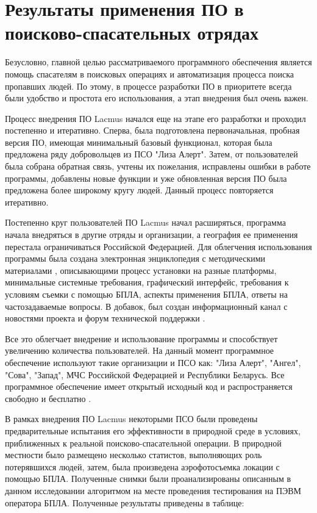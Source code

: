 \section{Результаты применения ПО в поисково-спасательных отрядах}\label{sect-8}

Безусловно, главной целью рассматриваемого программного обеспечения является помощь спасателям в поисковых операциях и автоматизация процесса поиска пропавших людей. По этому, в процессе разработки ПО в приоритете всегда были удобство и простота его использования, а этап внедрения был очень важен.

Процесс внедрения ПО Lacmus начался еще на этапе его разработки и проходил постепенно и итеративно. Сперва, была подготовлена первоначальная, пробная версия ПО, имеющая минимальный базовый функционал, которая была предложена ряду добровольцев из ПСО "Лиза Алерт". Затем, от пользователей была собрана обратная связь, учтены их пожелания, исправлены ошибки в работе программы, добавлены новые функции и уже обновленная версия ПО была предложена более широкому кругу людей. Данный процесс повторяется итеративно. 

Постепенно круг пользователей ПО Lacmus начал расширяться, программа начала внедряться в другие отряды и организации, а география ее применения перестала ограничиваться Российской Федерацией. Для облегчения использования программы была создана электронная энциклопедия с методическими материалами \cite{lib-lacmus-wiki}, описывающими процесс установки на разные платформы, минимальные системные требования, графический интерфейс, требования к условиям съемки с помощью БПЛА, аспекты применения БПЛА, ответы на частозадаваемые вопросы. В добавок, был создан информационный канал с новостями проекта \cite{lib-lacmus-news} и форум технической поддержки \cite{lib-lacmus-chat}.

Все это облегчает внедрение и использование программы и способствует увеличению количества пользователей. На данный момент программное обеспечение используют такие организации и ПСО как: "Лиза Алерт", "Ангел", "Сова", "Запад", МЧС Российской Федерацией и Республики Беларусь. Все программное обеспечение имеет открытый исходный код и распространяется свободно и бесплатно \cite{lib-lacmus} \cite{lib-lacmus-app}.

В рамках внедрения ПО Lacmus некоторыми ПСО были проведены предварительные испытания его эффективности в природной среде в условиях, приближенных к реальной поисково-спасательной операции. В природной местности было размещено несколько статистов, выполняющих роль потерявшихся людей, затем, была произведена аэрофотосъемка локации с помощью БПЛА. Полученные снимки были проанализированы описанным в данном исследовании алгоритмом на месте проведения тестирования на ПЭВМ оператора БПЛА. Полученные результаты приведены в таблице:

